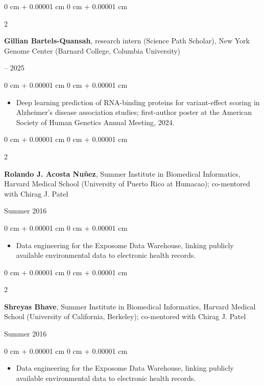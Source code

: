 \documentclass[10pt, letterpaper]{article}
\newenvironment{highlights}{
    \begin{itemize}[
        topsep=0.10 cm,
        parsep=0.10 cm,
        partopsep=0pt,
        itemsep=0pt,
        leftmargin=0 cm + 10pt
    ]
}{
    \end{itemize}
} %
\newenvironment{onecolentry}{
    \begin{adjustwidth}{
        0 cm + 0.00001 cm
    }{
        0 cm + 0.00001 cm
    }
}{
    \end{adjustwidth}
} %
\newenvironment{twocolentry}[2][]{
    \onecolentry
    \def\secondColumn{#2}
    \setcolumnwidth{\fill, 4.5 cm}
    \begin{paracol}{2}
}{
    \switchcolumn \raggedleft \secondColumn
    \end{paracol}
    \endonecolentry
} %
\begin{document}
    \vspace{0.20 cm}

    \begin{twocolentry}{
        2022 – 2025
    }
        \textbf{Gillian Bartels-Quansah}, research intern (Science Path Scholar), New York Genome Center (Barnard College, Columbia University)
    \end{twocolentry}

    \vspace{0.10 cm}
    \begin{onecolentry}
        \begin{highlights}
            \item Deep learning prediction of RNA-binding proteins for variant-effect scoring in Alzheimer's disease association studies; first-author poster at the American Society of Human Genetics Annual Meeting, 2024.
        \end{highlights}
    \end{onecolentry}

    \vspace{0.20 cm}

    \begin{twocolentry}{
        Summer 2016
    }
        \textbf{Rolando J. Acosta Nu\~nez}, Summer Institute in Biomedical Informatics, Harvard Medical School (University of Puerto Rico at Humacao); co-mentored with Chirag J. Patel
    \end{twocolentry}

    \vspace{0.10 cm}
    \begin{onecolentry}
        \begin{highlights}
            \item Data engineering for the Exposome Data Warehouse, linking publicly available environmental data to electronic health records.
        \end{highlights}
    \end{onecolentry}

    \vspace{0.20 cm}

    \begin{twocolentry}{
        Summer 2016
    }
        \textbf{Shreyas Bhave}, Summer Institute in Biomedical Informatics, Harvard Medical School (University of California, Berkeley); co-mentored with Chirag J. Patel
    \end{twocolentry}

    \vspace{0.10 cm}
    \begin{onecolentry}
        \begin{highlights}
            \item Data engineering for the Exposome Data Warehouse, linking publicly available environmental data to electronic health records.
        \end{highlights}
    \end{onecolentry}
\end{document}
